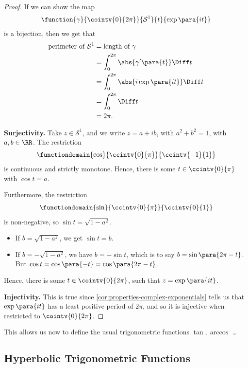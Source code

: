 \begin{proof}
    If we can show the map
    \[
        \function{\gamma}{\cointv{0}{2\pi}}{\mathcal{S}^1}{t}{\exp \para{it}}
    \]
    is a bijection, then we get that
    \begin{align*}
        \text{perimeter of }\mathcal{S}^1 &= \text{length of }\gamma \\
        &= \int_{0}^{2 \pi} \abs{\gamma' \para{t}} \Diff t \\
        &= \int_{0}^{2 \pi} \abs{i \exp \para{it}} \Diff t \\
        &= \int_{0}^{2 \pi} \Diff t \\
        &= 2 \pi.
    \end{align*}

    \textbf{Surjectivity.} Take \(z \in \mathcal{S}^1\), and we write \(z = a + ib\), with \(a^2 + b^2 = 1\), with \(a, b \in \RR\). The restriction
    \[
        \functiondomain{\cos}{\ccintv{0}{\pi}}{\ccintv{-1}{1}}
    \]
    is continuous and strictly monotone. Hence, there is some \(t \in \ccintv{0}{\pi}\) with \(\cos t = a\).

    Furthermore, the restriction
    \[
        \functiondomain{\sin}{\ccintv{0}{\pi}}{\ccintv{0}{1}}
    \]
    is non-negative, so \(\sin t = \sqrt{1 - a^2}\).
    
    \begin{itemize}
        \item If \(b = \sqrt{1 - a^2}\), we get \(\sin t = b\).
        \item If \(b = - \sqrt{1 - a^2}\), we have \(b = - \sin t\), which is to say \(b = \sin \para{2 \pi - t}\). But \(\cos t = \cos \para{-t} = \cos \para{2\pi - t}\).
    \end{itemize}

    Hence, there is some \(t \in \cointv{0}{2\pi}\), such that \(z = \exp \para{it}\).

    \textbf{Injectivity.} This is true since \autoref{cor:properties-complex-exponentials} tells us that \(\exp\para{it}\) has a least positive period of \(2 \pi\), and so it is injective when restricted to \(\cointv{0}{2\pi}\).
\end{proof}

This allows us now to define the usual trigonometric functions \(\tan, \arccos\) \dots

\subsection{Hyperbolic Trigonometric Functions}

